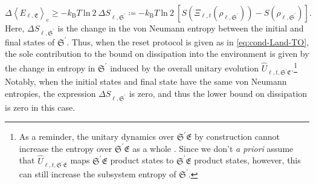 \documentclass[preprints,article,accept,moreauthors,pdftex]{Definitions/mdpi}
\begin{document}
\begin{paracol}{2}
\begin{equation}
    \label{eq:cond-Land-bound}
    \Delta \left\langle E_{\ell,\mathfrak{E}}\right\rangle_{\mathrm{c}} \geq -k_{\mathrm{B}}T\:\mathrm{ln}\:2\:\Delta S_{\ell,\mathfrak{S}^{\prime}} \coloneqq -k_{\mathrm{B}}T\:\mathrm{ln}\:2\:\left[S\left(\Xi_{\ell,t}\left(\rho_{\ell,\mathfrak{S}^{\prime}}\right)\right) - S\left(\rho_{\ell,\mathfrak{S}^{\prime}}\right)\right].
\end{equation}
Here, $\Delta S_{\ell,\mathfrak{S}^{\prime}}$ is the change in the von Neumann entropy between the initial and final states of $\mathfrak{S}^{\prime}$. Thus, when the reset protocol is given as in \eqref{eq:cond-Land-TO}, the sole contribution to the bound on dissipation into the environment is given by the change in entropy in $\mathfrak{S}^{\prime}$ induced by the overall unitary evolution $\widehat{U}_{\ell,t,\mathfrak{S^\prime E}}$.\footnote{As a reminder, the unitary dynamics over $\mathfrak{S^\prime E}$ by construction cannot increase the entropy over $\mathfrak{S^\prime E}$ as a whole \cite{Zur03,PRGWE16}. Since we don't \emph{a priori} assume that $\widehat{U}_{\ell,t,\mathfrak{S^\prime E}}$ maps $\mathfrak{S^\prime E}$ product states to $\mathfrak{S^\prime E}$ product states, however, this can still increase the subsystem entropy of $\mathfrak{S}^{\prime}$.} Notably, when the initial states and final state have the same von Neumann entropies, the expression $\Delta S_{\ell,\mathfrak{S}^{\prime}}$ is zero, and thus the lower bound on dissipation is zero in this case.


\end{paracol}
\end{document}
